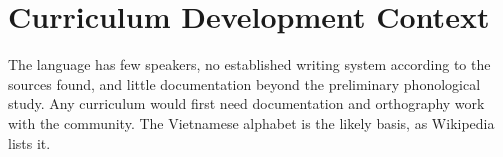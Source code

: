 \documentclass[12pt]{article}
\begin{document}
\section{Curriculum Development Context}
The language has few speakers, no established writing system according to the sources found, and little documentation beyond the preliminary phonological study. Any curriculum would first need documentation and orthography work with the community. The Vietnamese alphabet is the likely basis, as Wikipedia lists it.
\end{document}
